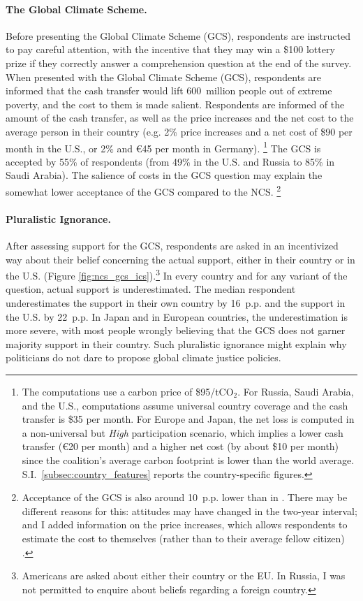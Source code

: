 \documentclass[12pt,english]{article}
\begin{document}
\begin{bibunit}
\paragraph{The Global Climate Scheme.}
Before presenting the Global Climate Scheme (GCS), respondents are instructed to pay careful attention, with the incentive that they may win a \$100 lottery prize if they correctly answer a comprehension question at the end of the survey.
When presented with the Global Climate Scheme (GCS), respondents are informed that the cash transfer would lift 600~million people out of extreme poverty, and the cost to them is made salient. Respondents are informed of the amount of the cash transfer, as well as the price increases and the net cost to the average person in their country (e.g. 2\% price increases and a net cost of \$90 per month in the U.S., or 2\% and \euro{}45 per month in Germany).%
\footnote{The computations use a carbon price of \$95/tCO$_\text{2}$. For Russia, Saudi Arabia, and the U.S., computations assume universal country coverage and the cash transfer is \$35 per month.
For Europe and Japan, the net loss is computed in a non-universal but \textit{High} participation scenario, which implies a lower cash transfer (\euro{}20 per month) and a higher net cost (by about \$10 per month) since the coalition's average carbon footprint is lower than the world average. S.I.~\ref{subsec:country_features} reports the country-specific figures.}
The GCS is accepted by 55\% of respondents (from 49\% in the U.S. and Russia to 85\% in Saudi Arabia). The salience of costs in the GCS question may explain the somewhat lower acceptance of the GCS compared to the NCS.%
\footnote{Acceptance of the GCS is also around 10~p.p. lower than in \cite{fabre_majority_2025}. There may be different reasons for this: attitudes may have changed in the two-year interval; and I added information on the price increases, which allows respondents to estimate the cost to themselves (rather than to their average fellow citizen)%
.}

\paragraph{Pluralistic Ignorance.}
After assessing support for the GCS, respondents are asked in an incentivized way about their belief concerning the actual support, either in their country or in the U.S. (Figure \ref{fig:ncs_gcs_ics}).\footnote{Americans are asked about either their country or the EU. In Russia, I was not permitted to enquire about beliefs regarding a foreign country.}
In every country and for any variant of the question, actual support is underestimated. The median respondent underestimates the support in their own country by 16~p.p. and the support in the U.S. by 22~p.p. In Japan and in European countries, the underestimation is more severe, with most people wrongly believing that the GCS does not garner majority support in their country. Such pluralistic ignorance might explain why politicians do not dare to propose global climate justice policies.


\end{bibunit}
\end{document}
